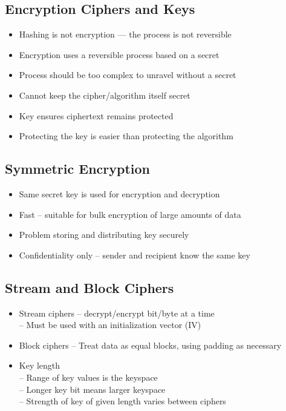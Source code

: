 	\subsection {Encryption Ciphers and Keys}
		\begin{itemize}
			\item Hashing is not encryption --- the process is not reversible
			\item Encryption uses a reversible process based on a secret
			\item Process should be too complex to unravel without a secret
			\item Cannot keep the cipher/algorithm itself secret
			\item Key ensures ciphertext remains protected
			\item Protecting the key is easier than protecting the algorithm
		\end{itemize}
	\subsection {Symmetric Encryption}
		\begin{itemize}
			\item Same secret key is used for encryption and decryption
			\item Fast -- suitable for bulk encryption of large amounts of data
			\item Problem storing and distributing key securely
			\item Confidentiality only -- sender and recipient know the same key
		\end{itemize}
	\subsection {Stream and Block Ciphers}
		\begin{itemize}
			\item Stream ciphers -- decrypt/encrypt bit/byte at a time \\
				-- Must be used with an initialization vector (IV)
			\item Block ciphers -- Treat data as equal blocks, using padding as necessary
			\item Key length \\
				-- Range of key values is the keyspace \\
				-- Longer key bit means larger keyspace \\
				-- Strength of key of given length varies between ciphers
		\end{itemize}
